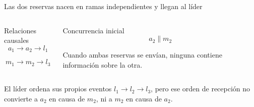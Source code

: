 \documentclass[institutional,screen,none]{ua-engineering-v6-beamer}
\begin{document}
\begin{frame}{Las dos reservas nacen en ramas independientes y llegan al líder}
\begin{center}
\end{center}

\vspace{0.08cm}

\begin{columns}[T]

\begin{block}{Relaciones causales}
\[
a_1\rightarrow a_2\rightarrow l_1
\]

\[
m_1\rightarrow m_2\rightarrow l_3
\]
\end{block}


\begin{block}{Concurrencia inicial}
\[
a_2\parallel m_2
\]

Cuando ambas reservas se envían, ninguna contiene información sobre la otra.
\end{block}
\end{columns}

\begin{uakeybox}
El líder ordena sus propios eventos
\(l_1\rightarrow l_2\rightarrow l_3\), pero ese orden de recepción
no convierte a \(a_2\) en causa de \(m_2\), ni a \(m_2\) en causa de \(a_2\).
\end{uakeybox}

\end{frame}
\end{document}

